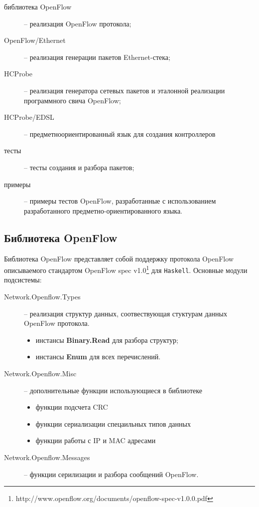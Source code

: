 \documentclass[9pt,a4paper]{article}
\begin{document}
\begin{description}
    \item[библиотека OpenFlow] -- реализация OpenFlow протокола;
    \item[OpenFlow/Ethernet]   -- реализация генерации пакетов Ethernet-стека;
    \item[HCProbe]             -- реализация генератора сетевых пакетов и эталонной
      реализации программного свича OpenFlow;
    \item[HCProbe/EDSL]        -- предметноориентированный язык для создания контроллеров
    \item[тесты]               -- тесты создания и разбора пакетов;
    \item[примеры]             -- примеры тестов OpenFlow, разработанные с использованием
      разработанного предметно-ориентированного языка.
\end{description}


\subsection{Библиотека OpenFlow}

Библиотека OpenFlow представляет собой поддержку протокола 
OpenFlow описываемого стандартом OpenFlow spec 
v1.0\footnote{http://www.openflow.org/documents/openflow-spec-v1.0.0.pdf}
для \texttt{Haskell}. Основные модули подсистемы:

\begin{description}
    \item[Network.Openflow.Types] -- реализация структур данных, соотвествующая
        стуктурам данных OpenFlow протокола.
        \begin{itemize}
            \item инстансы \textbf{Binary.Read} для разбора структур;
            \item инстансы \textbf{Enum} для всех перечислений.
        \end{itemize}
    \item[Network.Openflow.Misc] -- дополнительные функции использующиеся в библиотеке
        \begin{itemize}
            \item функции подсчета CRC
            \item функции сериализации спецаильных типов данных
            \item функции работы с IP и MAC адресами
        \end{itemize}
    \item[Network.Openflow.Messages] -- функции серилизации и разбора сообщений OpenFlow.
\end{description}
\end{document}
